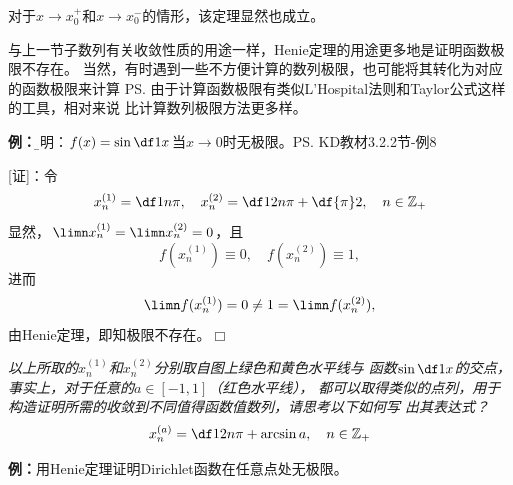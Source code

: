 对于$x\to x_0^+$和$x\to x_0^-$的情形，该定理显然也成立。

与上一节子数列有关收敛性质的用途一样，Henie定理的用途更多地是证明函数极限不存在。
当然，有时遇到一些不方便计算的数列极限，也可能将其转化为对应的函数极限来计算
\ps{由于计算函数极限有类似L'Hospital法则和Taylor公式这样的工具，相对来说
比计算数列极限方法更多样}。

{\bf 例：}{\b 证明：$f(x)=\sin\df 1x$当$x\to 0$时无极限。}\ps{KD教材3.2.2节-例8}

[证]：令
$$x^{(1)}_n=\df1{n\pi},\quad
x^{(2)}_n=\df1{2n\pi+\df{\pi}2},\quad n\in\mathbb{Z}_+$$ 
显然，$\limn x^{(1)}_n=\limn x^{(2)}_n=0$，且
$$f(x^{(1)}_n)\equiv0,\quad f(x^{(2)}_n)\equiv1,$$
进而
$$\limn f(x^{(1)}_n)=0\ne1=\limn f(x^{(2)}_n),$$
由Henie定理，即知极限不存在。\hfill $\Box$

\begin{center}
	
	{\it 以上所取的$x^{(1)}_n$和$x^{(2)}_n$分别取自图上绿色和黄色水平线与
	函数$\sin\df1x$的交点，事实上，对于任意的$a\in[-1,1]$（红色水平线），
	都可以取得类似的点列，用于构造证明所需的收敛到不同值得函数值数列，请思考以下如何写
	出其表达式？
	$$x^{(a)}_n=\df1{2n\pi+\arcsin a},\quad n\in\mathbb{Z}_+$$}
\end{center}

	{\bf 例：}用Henie定理证明Dirichlet函数在任意点处无极限。
	
% 	
	
